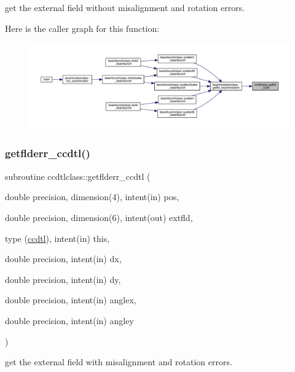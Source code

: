 get the external field without misalignment and rotation errors. 

Here is the caller graph for this function\+:\nopagebreak
\begin{figure}[H]
\begin{center}
\leavevmode
\includegraphics[width=350pt]{namespaceccdtlclass_a62eb43f6a732d52951d468e91a2312cb_icgraph}
\end{center}
\end{figure}
\mbox{\label{namespaceccdtlclass_ab81d1b262943e405eebe3bfef401bb97}} 
\subsubsection{\texorpdfstring{getflderr\_ccdtl()}{getflderr\_ccdtl()}}
{\footnotesize\ttfamily subroutine ccdtlclass\+::getflderr\+\_\+ccdtl (\begin{DoxyParamCaption}\item[{double precision, dimension(4), intent(in)}]{pos,  }\item[{double precision, dimension(6), intent(out)}]{extfld,  }\item[{type (\mbox{\hyperlink{namespaceccdtlclass_structccdtlclass_1_1ccdtl}{ccdtl}}), intent(in)}]{this,  }\item[{double precision, intent(in)}]{dx,  }\item[{double precision, intent(in)}]{dy,  }\item[{double precision, intent(in)}]{anglex,  }\item[{double precision, intent(in)}]{angley }\end{DoxyParamCaption})}



get the external field with misalignment and rotation errors. 

